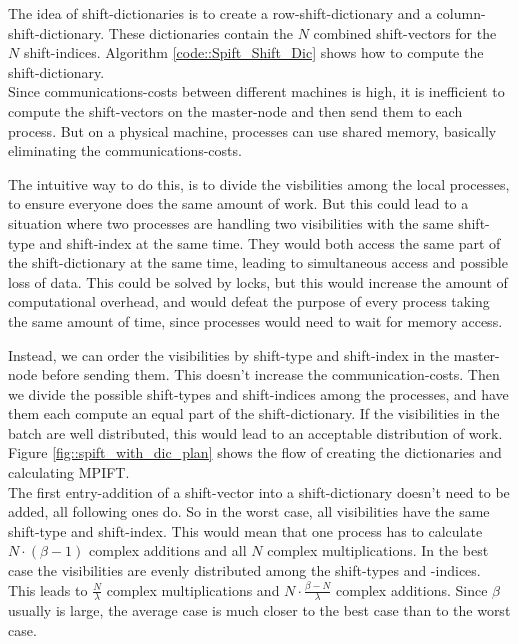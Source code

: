 \documentclass[12pt]{article}
\begin{document}
The idea of shift-dictionaries is to create a row-shift-dictionary and a column-shift-dictionary. These dictionaries contain the $N$ combined shift-vectors for the $N$ shift-indices. Algorithm \ref{code::Spift_Shift_Dic} shows how to compute the shift-dictionary. \\

 Since communications-costs between different machines is high, it is inefficient to  compute the shift-vectors on the master-node and then send them to each process. But on a physical machine, processes can use shared memory, basically eliminating the communications-costs.
 
 The intuitive way to do this, is to divide the visbilities among the local processes, to ensure everyone does the same amount of work. But this could lead to a situation where two processes are handling two visibilities with the same shift-type and shift-index at the same time. They would both access the same part of the shift-dictionary at the same time, leading to simultaneous access and possible loss of data. This could be solved by locks, but this would increase the amount of computational overhead, and would defeat the purpose of every process taking the same amount of time, since processes would need to wait for memory access.
  
 Instead, we can order the visibilities by shift-type and shift-index in the master-node before sending them. This doesn't increase the communication-costs. Then we divide the possible shift-types and shift-indices among the processes, and have them each compute an equal part of the shift-dictionary. If the visibilities in the batch are well distributed, this would lead to an acceptable distribution of work. Figure \ref{fig::spift_with_dic_plan} shows the flow of creating the dictionaries and calculating MPIFT.\\
  
 The first entry-addition of a shift-vector into a shift-dictionary doesn't need to be added, all following ones do. So in the worst case, all visibilities have the same shift-type and shift-index. This would mean that one process has to calculate $N\cdot (\beta-1)$ complex additions and all $N$ complex multiplications. In the best case the visibilities are evenly distributed among the shift-types and -indices. This leads to $\frac{N}{\lambda}$ complex multiplications and $N\cdot \frac{\beta-N}{\lambda}$ complex additions. Since $\beta$ usually is large, the average case is much closer to the best case than to the worst case.
\end{document}
